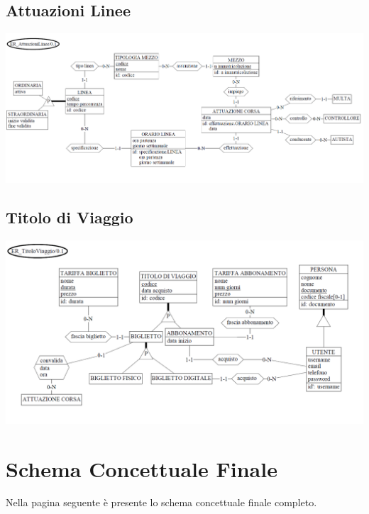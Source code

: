 \documentclass[12pt,a4paper]{report}
\begin{document}
\subsection{Attuazioni Linee}
\includegraphics[width=1.0\textwidth]{prog_conc/AttuazioniLinee}

\subsection{Titolo di Viaggio}
\includegraphics[width=1.0\textwidth]{prog_conc/TitoliViaggio}

\section{Schema Concettuale Finale}
Nella pagina seguente è presente lo schema concettuale finale completo.


\label{VincoliInespr}
\end{document}
